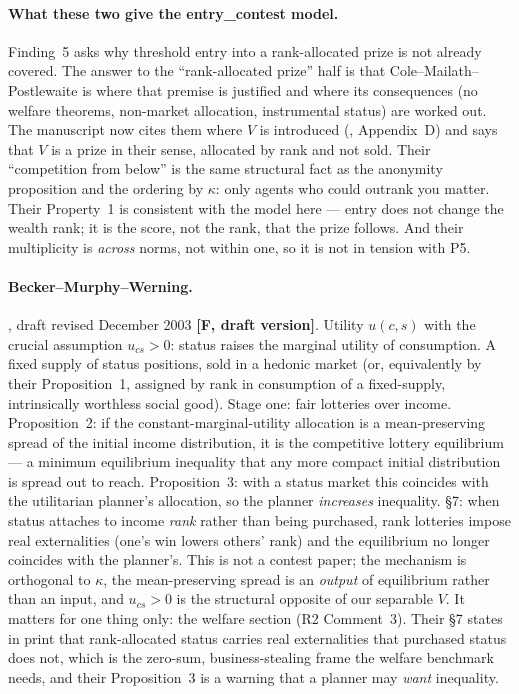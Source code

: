 \documentclass[11pt,a4paper]{article}
\begin{document}
\paragraph{What these two give the entry\_contest model.} Finding~5 asks why
threshold entry into a rank-allocated prize is not already covered. The
answer to the ``rank-allocated prize'' half is that Cole--Mailath--Postlewaite
is where that premise is justified and where its consequences (no welfare
theorems, non-market allocation, instrumental status) are worked out.
The manuscript now cites them where $V$ is introduced (,
Appendix~D) and says that $V$ is a prize in their sense, allocated by rank and
not sold. Their
``competition from below'' is the same structural fact as the anonymity
proposition and the ordering by $\kappa$: only agents who could outrank you
matter. Their Property~1 is consistent with the model here --- entry does not
change the wealth rank; it is the score, not the rank, that the prize follows.
And their multiplicity is \emph{across} norms, not within one, so it is not in
tension with P5.

\paragraph{Becker--Murphy--Werning.} \citet{BeckerMurphyWerning2005}, draft revised December 2003 \textbf{[F,
draft version]}. Utility $u(c,s)$ with the crucial assumption $u_{cs} > 0$:
status raises the marginal utility of consumption. A fixed supply of status
positions, sold in a hedonic market (or, equivalently by their Proposition~1,
assigned by rank in consumption of a fixed-supply, intrinsically worthless
social good). Stage one: fair lotteries over income. Proposition~2: if the
constant-marginal-utility allocation is a mean-preserving spread of the initial
income distribution, it is the competitive lottery equilibrium --- a minimum
equilibrium inequality that any more compact initial distribution is spread
out to reach. Proposition~3: with a status market this coincides with the
utilitarian planner's allocation, so the planner \emph{increases} inequality.
\S 7: when status attaches to income \emph{rank} rather than being purchased,
rank lotteries impose real externalities (one's win lowers others' rank) and
the equilibrium no longer coincides with the planner's. This is not a contest
paper; the mechanism is orthogonal to $\kappa$, the mean-preserving spread is
an \emph{output} of equilibrium rather than an input, and $u_{cs} > 0$ is the
structural opposite of our separable $V$. It matters for one thing only: the
welfare section (R2 Comment~3). Their \S 7 states in print that rank-allocated
status carries real externalities that purchased status does not, which is the
zero-sum, business-stealing frame the welfare benchmark needs, and their
Proposition~3 is a warning that a planner may \emph{want} inequality.
\end{document}
